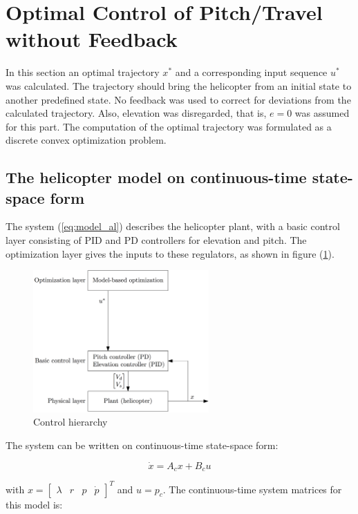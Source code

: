 \section{Optimal Control of Pitch/Travel without Feedback}\label{sec:prob2}

In this section an optimal trajectory $x^*$ and a corresponding input sequence $u^*$ was calculated. The trajectory should bring the helicopter from an initial state to another predefined state. No feedback was used to correct for deviations from the calculated trajectory. Also, elevation was disregarded, that is, $e=0$ was assumed for this part. The computation of the optimal trajectory was formulated as a discrete convex optimization problem.


\subsection{The helicopter model on continuous-time state-space form}

The system (\ref{eq:model_al}) describes the helicopter plant, with a basic control layer consisting of PID and PD controllers for elevation and pitch. The optimization layer gives the inputs to these regulators, as shown in figure (\ref{fig:control_hierarchy}).

\begin{figure}[ht]
	\centering
	\includegraphics[width=0.6\textwidth]{figures/day2/control_hierarchy_day2}
	\caption{Control hierarchy}
	\label{fig:control_hierarchy}
\end{figure}

The system can be written on continuous-time state-space form:

\begin{equation}
    \dot{x} = A_cx + B_cu
    \label{eq:state_space_axbu}
\end{equation}

with $x = \begin{bmatrix} \lambda & r & p & \dot{p} \end{bmatrix}^T$ and $u = p_c$.
The continuous-time system matrices for this model is:

